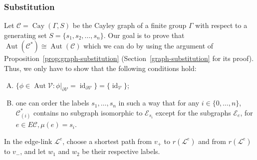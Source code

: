 \documentclass[ALCO,ThmDefs,Unicode,epreuves]{cedram}
\newcommand{\cC}{\mathcal{C}}
\newcommand{\cL}{\mathcal{L}}
\newcommand{\cV}{\mathcal{V}}
\newcommand{\cE}{\mathcal{E}}
\DeclareMathOperator{\Cay}{Cay}
\DeclareMathOperator{\aut}{Aut}
\DeclareMathOperator{\id}{id}
\begin{document}
\subsubsection{Substitution}\label{sssection:substitution-works}

Let $\cC=\Cay({\Gamma},S)$ be the Cayley graph of a finite group ${\Gamma}$ with respect to a generating set $S= \{s_1, s_2, \dots, s_n\}$. Our goal is to prove that $\aut(\cC^{*}) \cong \aut(\cC)$ which we can do by using the argument of Proposition~\ref{prop:graph-substitution} (\cf Section~\ref{graph-substitution} for its proof). Thus, we only have to show that the following conditions hold:

\begin{enumerate}[S.\arabic*]
\item %
$\{ \phi \in \aut \cV : {\phi}|_{ {\partial}\cV } = \id _{{\partial} \cV} \} = \{ \id _{\cV} \}$;
\item %
one can order the labels $s_{1}, \dots, s_n$ in such a way that for any $i\in\{0, \dots ,n\}$, $\cC^*_{(i)}$ contains no subgraph isomorphic to $\cE_{s_{i}}$ except for the subgraphs $\cE_{e}$, for $e\in E\cC,{\mu}(e)=s_{i}$.
\end{enumerate}

In the edge-link $\cL^e$, choose a shortest path from $v_{+}$ to $r(\cL^e)$ and from $r(\cL^e)$ to $v_{-}$, and let $w_{1}$ and $w_{2}$ be their respective labels.
\end{document}
